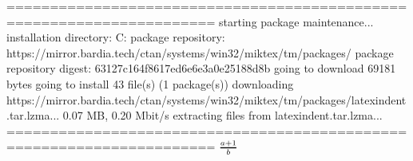 
======================================================================
starting package maintenance...
installation directory: C:\Users\devrh\AppData\Local\Programs\MiKTeX
package repository: https://mirror.bardia.tech/ctan/systems/win32/miktex/tm/packages/
package repository digest: 63127c164f8617ed6e6e3a0e25188d8b
going to download 69181 bytes
going to install 43 file(s) (1 package(s))
downloading https://mirror.bardia.tech/ctan/systems/win32/miktex/tm/packages/latexindent.tar.lzma...
0.07 MB, 0.20 Mbit/s
extracting files from latexindent.tar.lzma...
======================================================================
$ a+1 \above 1pt b $